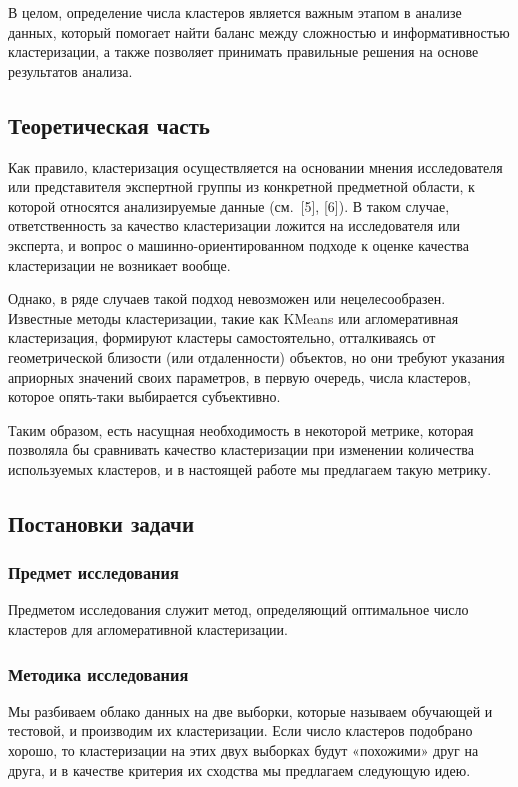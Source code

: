 \documentclass[a4paper,12pt]{article}
\begin{document}
В целом, определение числа кластеров является важным этапом в анализе данных, который помогает найти баланс между сложностью и информативностью кластеризации, а также позволяет принимать правильные решения на основе результатов анализа.


\subsection{Теоретическая часть}

Как правило, кластеризация осуществляется на основании мнения исследователя или представителя экспертной группы из конкретной предметной области, к которой относятся анализируемые данные (см. [5], [6]). В таком случае, ответственность за качество кластеризации ложится на исследователя или эксперта, и вопрос о машинно-ориентированном подходе к оценке качества кластеризации не возникает вообще.

Однако, в ряде случаев такой подход невозможен или нецелесообразен. Известные методы кластеризации, такие как KMeans или агломеративная кластеризация, формируют кластеры самостоятельно, отталкиваясь от геометрической близости (или отдаленности) объектов, но они требуют указания априорных значений своих параметров, в первую очередь, числа кластеров, которое опять-таки выбирается субъективно.

Таким образом, есть насущная необходимость в некоторой метрике, которая позволяла бы сравнивать качество кластеризации при изменении количества используемых кластеров, и в настоящей работе мы предлагаем такую метрику.

\subsection{Постановки задачи}

\subsubsection{Предмет исследования}

Предметом исследования служит метод, определяющий оптимальное число кластеров для агломеративной кластеризации. 

\subsubsection{Методика исследования} 

Мы разбиваем облако данных на две выборки, которые называем обучающей и тестовой, и производим их кластеризации. Если число кластеров подобрано хорошо, то кластеризации на этих двух выборках будут «похожими» друг на друга, и в качестве критерия их сходства мы предлагаем следующую идею.
\end{document}
